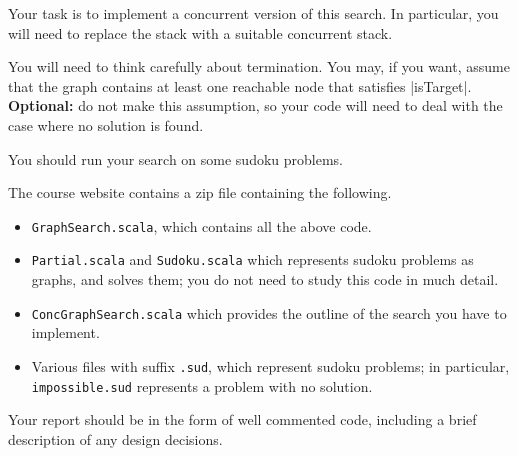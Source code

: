 \documentclass[12pt,a4paper]{article}
\begin{document}
Your task is to implement a concurrent version of this search.  In particular,
you will need to replace the stack with a suitable concurrent stack.  

You will need to think carefully about termination.  You may, if you
want, assume that the graph contains at least one reachable node that
satisfies |isTarget|.  \textbf{Optional:} do not make this assumption,
so your code will need to deal with the case where no solution is
found. 

You should run your search on some sudoku problems.

The course website contains a zip file containing the following.
%
\begin{itemize}
\item \texttt{GraphSearch.scala}, which contains all the above code.

\item \texttt{Partial.scala} and \texttt{Sudoku.scala} which represents sudoku
problems as graphs, and solves them; you do not need to study this code in
much detail.

\item \texttt{ConcGraphSearch.scala} which provides the outline of the search
you have to implement.

\item Various files with suffix \texttt{.sud}, which represent sudoku
problems; in particular, \texttt{impossible.sud} represents a problem with no
solution. 

\end{itemize}

Your report should be in the form of well commented code, including a brief
description of any design decisions. 
\end{document}
